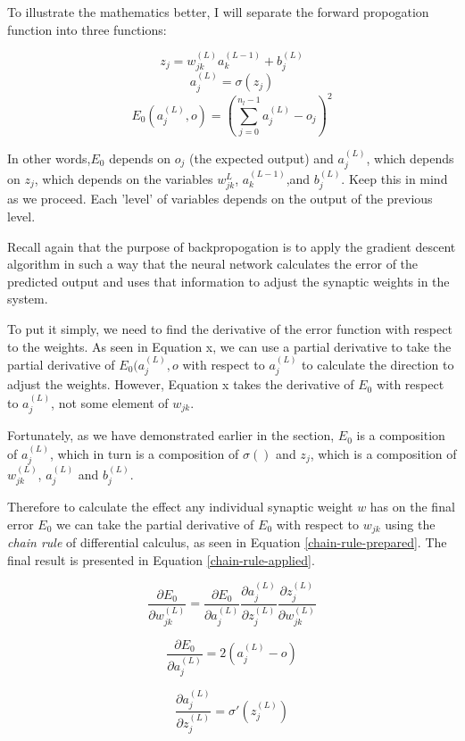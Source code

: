 \documentclass[12pt]{article}
\begin{document}
To illustrate the mathematics better, I will separate the forward propogation function into three functions:

\[ z_j = w_{jk}^{ (L)}a_k^{(L-1)} + b_j^{(L)} \]
\[ a_j^{(L)} =\sigma (z_j) \]
\[ E_0(a_j^{(L)}, o) = (\sum_{j=0}^{n_l-1} a_j^{(L)} - o_j)^2 \]

In other words,$E_0$ depends on $o_j$ (the expected output) and $a_j^{(L)}$, which depends on $z_j$, which depends on the variables $w_{jk}^{L}$, $a_k^{(L-1)}$,and $b_j^{(L)}$. Keep this in mind as we proceed. Each 'level' of variables depends on the output of the previous level.

Recall again that the purpose of backpropogation is to apply the gradient descent algorithm in such a way that the neural network calculates the error of the predicted output and uses that information to adjust the synaptic weights in the system.

To put it simply, we need to find the derivative of the error function with respect to the weights. As seen in Equation x, we can use a partial derivative to take the partial derivative of \(E_0(a_j^{(L)}, o\) with respect to \(a_j^{(L)}\) to calculate the direction to adjust the weights. However, Equation x takes the derivative of \(E_0\) with respect to \(a_j^{(L)}\), not some element of $w_{jk}$.

Fortunately, as we have demonstrated earlier in the section, $E_0$ is a composition of $a_j^{(L)}$, which in turn is a composition of $\sigma ()$ and $z_j$, which is a composition of $w_{jk}^{(L)}$, $a_j^{(L)}$ and $b_j^{(L)}$.

Therefore to calculate the effect any individual synaptic weight $w$ has on the final error $E_0$ we can take the partial derivative of $E_0$ with respect to $w_{jk}$ using the \textit{chain rule} of differential calculus, as seen in Equation \ref{chain-rule-prepared}. The final result is presented in Equation \ref{chain-rule-applied}.

\begin{equation} \label{chain-rule-prepared}
    \frac{\partial E_0}{\partial w_{jk}^{(L)}} = \frac{\partial E_0}{\partial a_j^{(L)}}  \frac{\partial a_j^{(L)}}{\partial z_j^{(L)}} \frac{\partial z_j^{(L)}}{\partial w_{jk}^{(L)}}
\end{equation}

\[ \frac{\partial E_0}{\partial a_j^{(L)}} = 2 (a_j^{(L)} - o)\]

\[ \frac{\partial a_j^{(L)}}{\partial z_j^{(L)}} = \sigma '(z_j^{(L)}) \]
\end{document}
